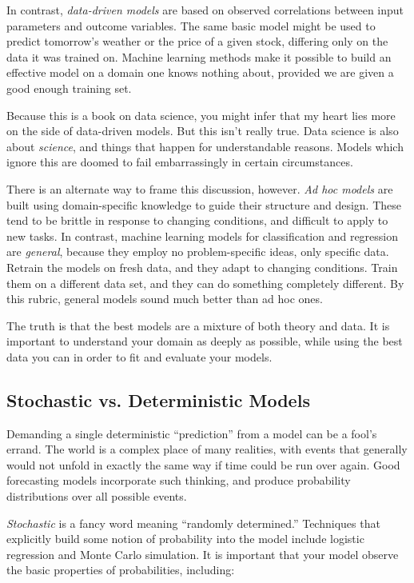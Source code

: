 \documentclass[10pt]{article}
\begin{document}
In contrast, \textit{data-driven models} are based on observed correlations between input parameters and outcome variables. The same basic model might be used to predict tomorrow’s weather or the price of a given stock, differing only on the data it was trained on. Machine learning methods make it possible to build an effective model on a domain one knows nothing about, provided we are given a good enough training set.

Because this is a book on data science, you might infer that my heart lies more on the side of data-driven models. But this isn’t really true. Data science is also about \textit{science}, and things that happen for understandable reasons. Models which ignore this are doomed to fail embarrassingly in certain circumstances.

There is an alternate way to frame this discussion, however. \textit{Ad hoc models} are built using domain-specific knowledge to guide their structure and design. These tend to be brittle in response to changing conditions, and difficult to apply to new tasks. In contrast, machine learning models for classification and regression are \textit{general}, because they employ no problem-specific ideas, only specific data. Retrain the models on fresh data, and they adapt to changing conditions. Train them on a different data set, and they can do something completely different. By this rubric, general models sound much better than ad hoc ones.

The truth is that the best models are a mixture of both theory and data. It is important to understand your domain as deeply as possible, while using the best data you can in order to fit and evaluate your models.

\subsection{Stochastic vs. Deterministic Models}

Demanding a single deterministic “prediction” from a model can be a fool’s errand. The world is a complex place of many realities, with events that generally would not unfold in exactly the same way if time could be run over again. Good forecasting models incorporate such thinking, and produce probability distributions over all possible events.

\textit{Stochastic} is a fancy word meaning “randomly determined.” Techniques that explicitly build some notion of probability into the model include logistic regression and Monte Carlo simulation. It is important that your model observe the basic properties of probabilities, including:
\end{document}
